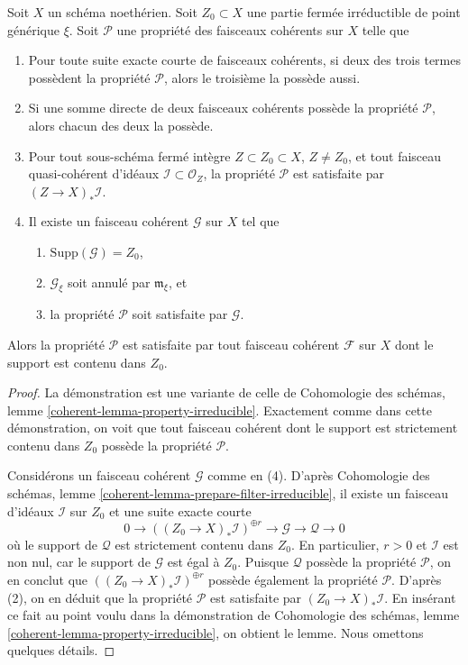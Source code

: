 \begin{lemma}
\label{lemma-property-irreducible-higher-rank}
Soit $X$ un schéma noethérien.
Soit $Z_0 \subset X$ une partie fermée irréductible de point générique $\xi$.
Soit $\mathcal{P}$ une propriété des faisceaux cohérents sur $X$ telle que
\begin{enumerate}
\item Pour toute suite exacte courte de faisceaux cohérents, si deux
des trois termes possèdent la propriété $\mathcal{P}$, alors le troisième
la possède aussi.
\item Si une somme directe de deux faisceaux cohérents possède la propriété
$\mathcal{P}$, alors chacun des deux la possède.
\item Pour tout sous-schéma fermé intègre $Z \subset Z_0 \subset X$,
$Z \not = Z_0$, et tout faisceau quasi-cohérent d'idéaux
$\mathcal{I} \subset \mathcal{O}_Z$, la propriété $\mathcal{P}$ est satisfaite
par $(Z \to X)_*\mathcal{I}$.
\item Il existe un faisceau cohérent $\mathcal{G}$ sur $X$ tel que
\begin{enumerate}
\item $\text{Supp}(\mathcal{G}) = Z_0$,
\item $\mathcal{G}_\xi$ soit annulé par $\mathfrak m_\xi$, et
\item la propriété $\mathcal{P}$ soit satisfaite par $\mathcal{G}$.
\end{enumerate}
\end{enumerate}
Alors la propriété $\mathcal{P}$ est satisfaite par tout faisceau cohérent
$\mathcal{F}$ sur $X$ dont le support est contenu dans $Z_0$.
\end{lemma}

\begin{proof}
La démonstration est une variante de celle de
Cohomologie des schémas, lemme \ref{coherent-lemma-property-irreducible}.
Exactement comme dans cette démonstration, on voit que
tout faisceau cohérent dont le support est strictement contenu dans $Z_0$
possède la propriété $\mathcal{P}$.

\medskip\noindent
Considérons un faisceau cohérent $\mathcal{G}$ comme en (4).
D'après Cohomologie des schémas, lemme \ref{coherent-lemma-prepare-filter-irreducible},
il existe un faisceau d'idéaux $\mathcal{I}$ sur $Z_0$ et
une suite exacte courte
$$
0 \to
\left((Z_0 \to X)_*\mathcal{I}\right)^{\oplus r} \to
\mathcal{G} \to
\mathcal{Q} \to 0
$$
où le support de $\mathcal{Q}$ est strictement contenu dans $Z_0$.
En particulier, $r > 0$ et $\mathcal{I}$ est non nul,
car le support de $\mathcal{G}$ est égal à $Z_0$.
Puisque $\mathcal{Q}$ possède la propriété $\mathcal{P}$, on en conclut que
$\left((Z_0 \to X)_*\mathcal{I}\right)^{\oplus r}$
possède également la propriété $\mathcal{P}$.
D'après (2), on en déduit que la propriété $\mathcal{P}$ est satisfaite par
$(Z_0 \to X)_*\mathcal{I}$. En insérant ce fait au point voulu dans la démonstration de
Cohomologie des schémas, lemme \ref{coherent-lemma-property-irreducible},
on obtient le lemme.
Nous omettons quelques détails.
\end{proof}

